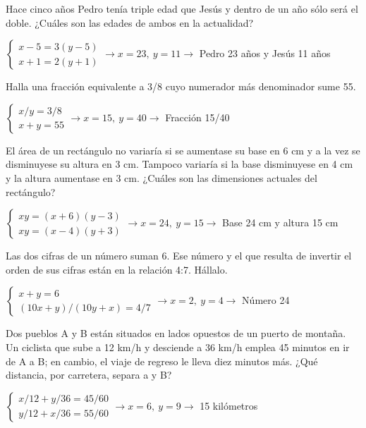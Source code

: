 \documentclass[spanish, 12pt]{exam}
\begin{document}
\begin{questions}
\question Hace cinco años Pedro tenía triple edad que Jesús y dentro de un año sólo será el doble. ¿Cuáles son las edades de ambos en la actualidad?
\begin{solution}$\left\{\begin{matrix}x-5=3(y-5) \\ x+1=2(y+1)\end{matrix}\right. \to  x = 23, \  y = 11 \to $ Pedro 23 años y Jesús 11 años \end{solution}

\question Halla una fracción equivalente a 3/8 cuyo numerador más denominador sume 55.

\begin{solution} $\left\{\begin{matrix}x/y=3/8 \\ x+y=55\end{matrix}\right. \to  x = 15, \  y = 40 \to $ Fracción 15/40 \end{solution}

\question El área de un rectángulo no variaría si se aumentase su base en 6 cm y a la vez se disminuyese su altura en 3 cm. Tampoco variaría si la base disminuyese en 4 cm y la altura aumentase en 3 cm. ¿Cuáles son las dimensiones actuales del rectángulo?
\begin{solution} $\left\{\begin{matrix}xy=(x+6)(y-3) \\ xy=(x-4)(y+3)\end{matrix}\right. \to  x = 24, \  y = 15 \to $ Base 24 cm y altura 15 cm \end{solution}

\question Las dos cifras de un número suman 6. Ese número y el que resulta de invertir el orden de sus cifras están en la relación 4:7. Hállalo.
\begin{solution}  $\left\{\begin{matrix}x+y=6 \\ (10x+y)/(10y+x)=4/7\end{matrix}\right. \to  x = 2, \  y = 4 \to $ Número 24 \end{solution}

\question Dos pueblos A y B están situados en lados opuestos de un puerto de montaña. Un ciclista que sube a 12 km/h y desciende a 36 km/h emplea 45 minutos en ir de A a B; en cambio, el viaje de regreso le lleva diez minutos más. ¿Qué distancia, por carretera, separa a y B?
\begin{solution} $\left\{\begin{matrix}x/12+y/36=45/60 \\ y/12+x/36=55/60\end{matrix}\right. \to  x = 6, \  y = 9 \to $ 15 kilómetros \end{solution}


\end{questions}
\end{document}
